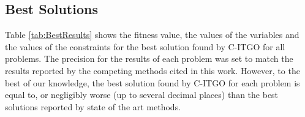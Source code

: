 \subsection{Best Solutions}

Table \ref{tab:BestResults} shows the fitness value, the values of the variables and the values of the constraints for the best solution found by C-ITGO for all problems. The precision for the results of each problem was set to match the results reported by the competing methods cited in this work. However, to the best of our knowledge, the best solution found by C-ITGO for each problem is equal to, or negligibly worse (up to several decimal places) than the best solutions reported by state of the art methods.

